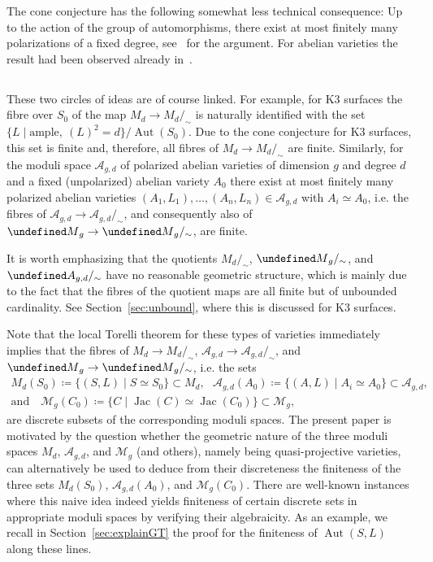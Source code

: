 \documentclass[11pt]{article}
\theoremstyle{definition}
\numberwithin{equation}{section}
\numberwithin{figure}{section}
\numberwithin{table}{section}
\let\cal\undefined
\DeclareMathOperator{\Aut}{Aut}
\DeclareMathOperator{\Jac}{Jac}
\newcommand{\cal}{\mathcal}
\newcommand{\ka}{{\cal A}}
\newcommand{\km}{{\cal M}}
\renewcommand{\cong}{\simeq}
\begin{document}
The cone conjecture has the following somewhat less technical consequence: Up to the action of the group of automorphisms, there exist at most finitely many polarizations of a fixed degree, see~\cite{Sterk} for the argument. For abelian varieties the result had been observed already in~\cite{NarNor}.

\subsection{}
These two circles of ideas are of course linked. For example, for K3 surfaces the fibre over $S_0$ of the map $M_d\to M_d/_\sim$ is naturally identified with the set $\{L\mid \text{ample},\ (L)^2=d\}/\Aut(S_0)$. Due to the cone conjecture for K3 surfaces, this set is finite and, therefore, all fibres of $M_d\to M_d/_\sim$ are finite. Similarly, for the moduli space ${\mathcal A}_{g,d}$ of polarized abelian varieties of dimension $g$ and degree $d$ and a fixed (unpolarized) abelian variety $A_0$ there exist at most finitely many polarized abelian varieties $(A_1,L_1), \dots,(A_n,L_n)\in {\mathcal A}_{g,d}$ with $A_i\cong A_0$, i.e. the fibres of ${\mathcal A}_{g,d}\to{\mathcal A}_{g,d}/_\sim$, and consequently also of $\km_g\to\km_g/_\sim$, are finite.

It is worth emphasizing that the quotients $M_d/_\sim$, $\km_g/_\sim$, and $\ka_{g,d}/_\sim$ have no reasonable geometric structure, which is mainly due to the fact that the fibres of the quotient maps are all finite but of unbounded cardinality. See Section~\ref{sec:unbound}, where this is discussed for K3 surfaces.

Note that the local Torelli theorem for these types of varieties immediately implies that the fibres of $M_d\to M_d/_\sim$, ${\mathcal A}_{g,d}\to{\mathcal A}_{g,d}/_\sim$, and $\km_g\to\km_g/_\sim$, i.e. the sets
\begin{gather*}
M_d(S_0)\coloneqq\{(S,L)\mid S\cong S_0\}\subset{M}_d, \text{~~}{\mathcal A}_{g,d}(A_0)\coloneqq
\{(A,L)\mid A_i\cong A_0\}\subset{\mathcal A}_{g,d},\\
\text{and}\quad
{\mathcal M}_g(C_0)\coloneqq\{C\mid \Jac(C)\cong\Jac(C_0)\}\subset{\mathcal M}_g,
\end{gather*}
are discrete subsets of the corresponding moduli spaces. The present paper is motivated by the question whether the geometric nature of the three moduli spaces ${M}_d$, ${\mathcal A}_{g,d}$, and ${\mathcal M}_g$ (and others), namely being quasi-projective varieties, can alternatively be used to deduce from their discreteness the finiteness of the three sets $M_d(S_0)$, ${\mathcal A}_{g,d}(A_0)$, and ${\mathcal M}_{g}(C_0)$. There are well-known instances where this naive idea indeed yields finiteness of certain discrete sets in appropriate moduli spaces by verifying their algebraicity. As an example, we recall in Section~\ref{sec:explainGT} the proof for the finiteness of $\Aut(S,L)$ along these lines.
\end{document}
